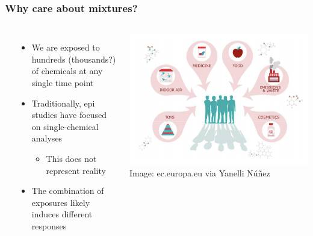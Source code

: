 \frame
{\frametitle{ Why care about mixtures? }
\begin{columns}
\vspace{2ex} \\
    \begin{itemize}
        \item We are exposed to hundreds (thousands?) of chemicals at any single time point
        \item Traditionally, epi studies have focused on single-chemical analyses
        \begin{itemize}
            \item This does not represent reality
        \end{itemize}
        \item The {\color{matbluedark} combination} of exposures likely induces different responses 
    \end{itemize}
\begin{center}
	\includegraphics[scale=0.3]{figures/europa_image.png} \\
\raggedleft
	{\tiny\color{hgray}Image: ec.europa.eu via Yanelli N\'{u}\~{n}ez}
\end{center}
\end{columns}
}

